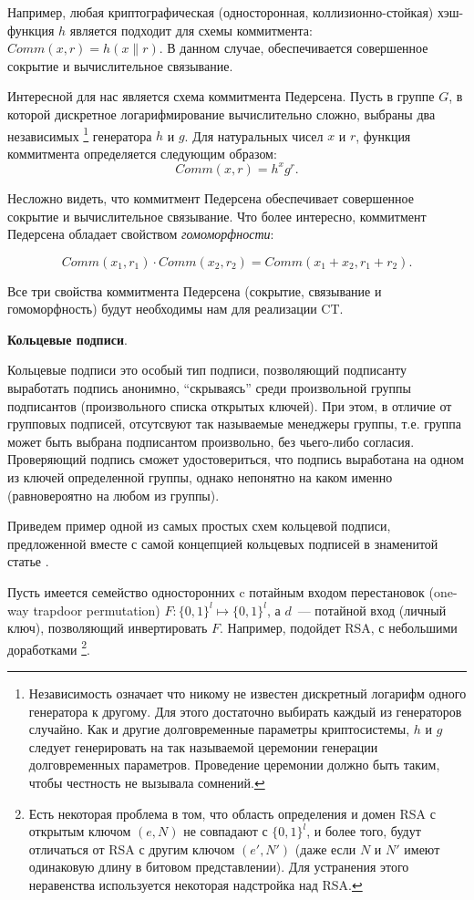 \documentclass{article}
\begin{document}
Например, любая криптографическая (односторонная, коллизионно-стойкая) хэш-функция $h$ является подходит
для схемы коммитмента: $Comm(x, r) = h(x \parallel r)$. В данном случае,
обеспечивается совершенное сокрытие и вычислительное связывание.

Интересной для нас является схема коммитмента Педерсена.
Пусть в группе $G$, в которой дискретное логарифмирование вычислительно сложно,
 выбраны два независимых
\footnote{Независимость означает что никому не известен дискретный логарифм одного генератора к другому.
Для этого достаточно выбирать каждый из генераторов случайно.
Как и другие долговременные параметры криптосистемы,
$h$ и $g$ следует генерировать на так называемой церемонии генерации долговременных параметров.
Проведение церемонии должно быть таким, чтобы честность не вызывала сомнений.}
 генератора $h$ и $g$. Для натуральных чисел $x$ и $r$,
 функция коммитмента определяется следующим образом:
 $$
 Comm(x, r) = h^x g^r.
 $$

 Несложно видеть, что коммитмент Педерсена обеспечивает совершенное сокрытие и вычислительное связывание.
 Что более интересно, коммитмент Педерсена обладает свойством \textit{гомоморфности}:

 $$
 Comm(x_1, r_1) \cdot Comm(x_2, r_2) = Comm(x_1 + x_2, r_1 + r_2).
 $$

Все три свойства коммитмента Педерсена (сокрытие, связывание и гомоморфность)
будут необходимы нам для реализации CT.

{\bf Кольцевые подписи}.

Кольцевые подписи это особый тип подписи,
позволяющий подписанту выработать подпись анонимно,
``скрываясь'' среди произвольной группы подписантов (произвольного списка открытых ключей).
При этом, в отличие от групповых подписей,
отсутсвуют так называемые менеджеры группы,
т.е. группа может быть выбрана подписантом произвольно,
без чьего-либо согласия. Проверяющий подпись сможет удостовериться,
что подпись выработана на одном из ключей определенной группы,
однако непонятно на каком именно (равновероятно на любом из группы).

Приведем пример одной из самых простых схем кольцевой подписи,
предложенной вместе с самой концепцией кольцевых подписей в знаменитой статье \cite{ringSig}.

Пусть имеется семейство односторонних c потайным входом перестановок (one-way trapdoor permutation)
$F: \{0,1\}^l \mapsto \{0,1\}^l$, а $d$~--- потайной вход (личный ключ),
позволяющий инвертировать $F$.
Например, подойдет RSA, с небольшими доработками
\footnote{Есть некоторая проблема в том,
что область определения и домен RSA с открытым ключом $(e, N)$ не совпадают с $\{0,1\}^l$,
и более того, будут отличаться от RSA с другим ключом $(e', N')$
(даже если $N$ и $N'$ имеют одинаковую длину в битовом представлении).
Для устранения этого неравенства используется некоторая надстройка над RSA.}.
\end{document}
